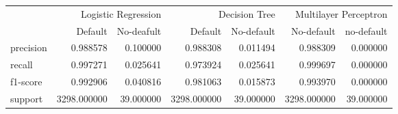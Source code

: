 \begin{table}
\thcenter
\begin{tabular}{lrrrrrr}
 & \multicolumn{2}{r}{Logistic Regression} & \multicolumn{2}{r}{Decision Tree  } & \multicolumn{2}{r}{Multilayer Perceptron} \\
 & Default & No-deafult & Default & No-default & No-default & no-default \\
precision & 0.988578 & 0.100000 & 0.988308 & 0.011494 & 0.988309 & 0.000000 \\
recall & 0.997271 & 0.025641 & 0.973924 & 0.025641 & 0.999697 & 0.000000 \\
f1-score & 0.992906 & 0.040816 & 0.981063 & 0.015873 & 0.993970 & 0.000000 \\
support & 3298.000000 & 39.000000 & 3298.000000 & 39.000000 & 3298.000000 & 39.000000 \\
\end{tabular}
\end{table}
